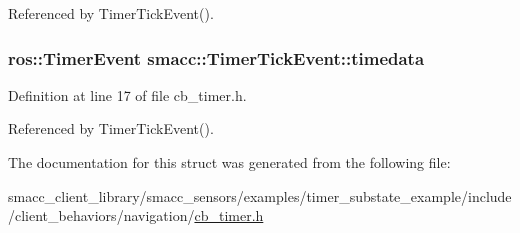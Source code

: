 Referenced by Timer\+Tick\+Event().

\subsubsection[{\texorpdfstring{timedata}{timedata}}]{\setlength{\rightskip}{0pt plus 5cm}ros\+::\+Timer\+Event smacc\+::\+Timer\+Tick\+Event\+::timedata}\hypertarget{structsmacc_1_1TimerTickEvent_afac83d8b00999b26c2365932030389e9}{}\label{structsmacc_1_1TimerTickEvent_afac83d8b00999b26c2365932030389e9}


Definition at line 17 of file cb\+\_\+timer.\+h.



Referenced by Timer\+Tick\+Event().



The documentation for this struct was generated from the following file\+:\begin{DoxyCompactItemize}
\item 
smacc\+\_\+client\+\_\+library/smacc\+\_\+sensors/examples/timer\+\_\+substate\+\_\+example/include/client\+\_\+behaviors/navigation/\hyperlink{cb__timer_8h}{cb\+\_\+timer.\+h}\end{DoxyCompactItemize}
